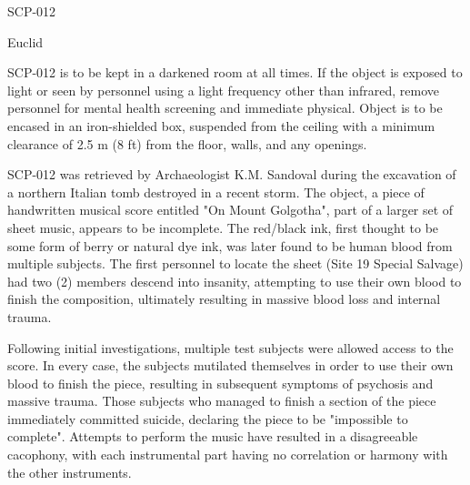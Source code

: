 
 SCP-012

 Euclid

 SCP-012 is to be kept in a darkened room at all times. If the object is exposed to light or seen by personnel using a light frequency other than infrared, remove personnel for mental health screening and immediate physical. Object is to be encased in an iron-shielded box, suspended from the ceiling with a minimum clearance of 2.5 m (8 ft) from the floor, walls, and any openings.

 SCP-012 was retrieved by Archaeologist K.M. Sandoval during the excavation of a northern Italian tomb destroyed in a recent storm. The object, a piece of handwritten musical score entitled "On Mount Golgotha", part of a larger set of sheet music, appears to be incomplete. The red/black ink, first thought to be some form of berry or natural dye ink, was later found to be human blood from multiple subjects. The first personnel to locate the sheet (Site 19 Special Salvage) had two (2) members descend into insanity, attempting to use their own blood to finish the composition, ultimately resulting in massive blood loss and internal trauma.

Following initial investigations, multiple test subjects were allowed access to the score. In every case, the subjects mutilated themselves in order to use their own blood to finish the piece, resulting in subsequent symptoms of psychosis and massive trauma. Those subjects who managed to finish a section of the piece immediately committed suicide, declaring the piece to be "impossible to complete". Attempts to perform the music have resulted in a disagreeable cacophony, with each instrumental part having no correlation or harmony with the other instruments.